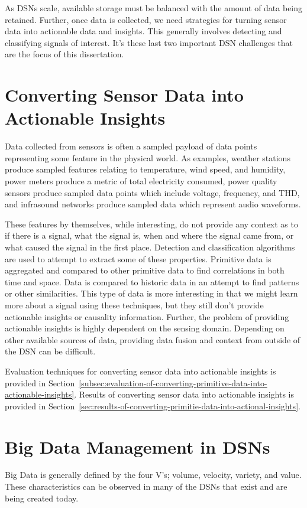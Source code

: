 As DSNs scale, available storage must be balanced with the amount of data being retained. Further, once data is collected, we need strategies for turning sensor data into actionable data and insights. This generally involves detecting and classifying signals of interest. It's these last two important DSN challenges that are the focus of this dissertation.

\section{Converting Sensor Data into Actionable Insights}\label{sec:converting-sensor-data-into-actionable-insights}
Data collected from sensors is often a sampled payload of data points representing some feature in the physical world. As examples, weather stations produce sampled features relating to temperature, wind speed, and humidity, power meters produce a metric of total electricity consumed, power quality sensors produce sampled data points which include voltage, frequency, and THD, and infrasound networks produce sampled data which represent audio waveforms.

These features by themselves, while interesting, do not provide any context as to if there is a signal, what the signal is, when and where the signal came from, or what caused the signal in the first place. Detection and classification algorithms are used to attempt to extract some of these properties. Primitive data is aggregated and compared to other primitive data to find correlations in both time and space. Data is compared to historic data in an attempt to find patterns or other similarities. This type of data is more interesting in that we might learn more about a signal using these techniques, but they still don't provide actionable insights or causality information. Further, the problem of providing actionable insights is highly dependent on the sensing domain. Depending on other available sources of data, providing data fusion and context from outside of the DSN can be difficult.

Evaluation techniques for converting sensor data into actionable insights is provided in Section~\ref{subsec:evaluation-of-converting-primitive-data-into-actionable-insights}. Results of converting sensor data into actionable insights is provided in Section~\ref{sec:results-of-converting-primitie-data-into-actional-insights}.

\section{Big Data Management in DSNs}\label{sec:big-data-management-in-dsns}
Big Data is generally defined by the four V's; volume, velocity, variety, and value. These characteristics can be observed in many of the DSNs that exist and are being created today.

